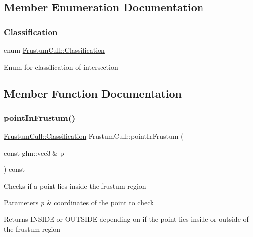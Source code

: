 \subsection{Member Enumeration Documentation}
\mbox{\label{class_frustum_cull_ac3f2e416581ca09b43008ac4acabc508}} 
\subsubsection{\texorpdfstring{Classification}{Classification}}
{\footnotesize\ttfamily enum \mbox{\hyperlink{class_frustum_cull_ac3f2e416581ca09b43008ac4acabc508}{Frustum\+Cull\+::\+Classification}}}

Enum for classification of intersection 

\subsection{Member Function Documentation}
\mbox{\label{class_frustum_cull_a7f85e51b496174f49ecb9e4aaada2628}} 
\subsubsection{\texorpdfstring{pointInFrustum()}{pointInFrustum()}}
{\footnotesize\ttfamily \mbox{\hyperlink{class_frustum_cull_ac3f2e416581ca09b43008ac4acabc508}{Frustum\+Cull\+::\+Classification}} Frustum\+Cull\+::point\+In\+Frustum (\begin{DoxyParamCaption}\item[{const glm\+::vec3 \&}]{p }\end{DoxyParamCaption}) const}

Checks if a point lies inside the frustum region


\begin{DoxyParams}{Parameters}
{\em p} & coordinates of the point to check \\
\hline
\end{DoxyParams}
\begin{DoxyReturn}{Returns}
I\+N\+S\+I\+DE or O\+U\+T\+S\+I\+DE depending on if the point lies inside or outside of the frustum region 
\end{DoxyReturn}
\mbox{\label{class_frustum_cull_aab9e225ad60c090feed4824a3393c800}} 
